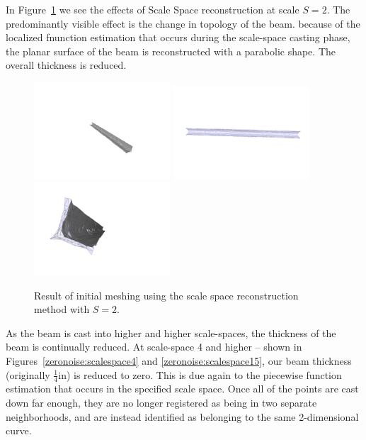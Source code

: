 \documentclass[12pt]{drexelthesis}
\begin{document}
In Figure~\ref{zeronoise:scalespace2} we see the effects of Scale Space reconstruction at scale $S = 2$. The predominantly visible effect is the change in topology of the beam. because of the localized fnunction estimation that occurs during the scale-space casting phase, the planar surface of the beam is reconstructed with a parabolic shape. The overall thickness is reduced.

\begin{figure}[!ht]
	\centering
		\includegraphics[trim={5in 2in 3in 3in},clip,width=2in]{simulated-lab-scan/0noise/clean/scale200.png}
		\includegraphics[width=2in]{simulated-lab-scan/0noise/clean/scalespace201.png}
		\includegraphics[width=2in]{simulated-lab-scan/0noise/clean/scalespace202.png}
		\caption[Initial meshing using a scale space reconstruction with $S = 2$]{\centering  Result of initial meshing using the scale space reconstruction method with $S = 2$.}
	\label{zeronoise:scalespace2}
\end{figure}

As the beam is cast into higher and higher scale-spaces, the thickness of the beam is continually reduced. At scale-space 4 and higher -- shown in Figures~\ref{zeronoise:scalespace4} and \ref{zeronoise:scalespace15}, our beam thickness (originally $\frac{1}{4}$in) is reduced to zero. This is due again to the piecewise function estimation that occurs in the specified scale space. Once all of the points are cast down far enough, they are no longer registered as being in two separate neighborhoods, and are instead identified as belonging to the same 2-dimensional curve.
\end{document}
